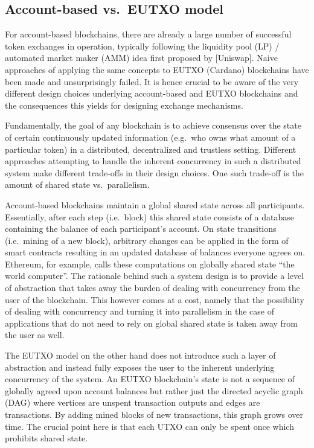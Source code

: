 \documentclass[11pt]{article}
\begin{document}
\subsection{Account-based vs.\ EUTXO model}\label{account-vs-eutxo}

For account-based blockchains, there are already a large number of successful token exchanges in operation, typically following the liquidity pool (LP) / automated market maker (AMM) idea first proposed by [Uniswap]. Naive approaches of applying the same concepts to EUTXO (Cardano) blockchains have been made and unsurprisingly failed. It is hence crucial to be aware of the very different design choices underlying account-based and EUTXO blockchains and the consequences this yields for designing exchange mechanisms.

Fundamentally, the goal of any blockchain is to achieve consensus over the state of certain continuously updated information (e.g.\ who owns what amount of a particular token) in a distributed, decentralized and trustless setting. Different approaches attempting to handle the inherent concurrency in such a distributed system make different trade-offs in their design choices. One such trade-off is the amount of shared state vs.\ parallelism.

Account-based blockchains maintain a global shared state across all participants. Essentially, after each step (i.e.\ block) this shared state consists of a database containing the balance of each participant's account. On state transitions (i.e.\ mining of a new block), arbitrary changes can be applied in the form of smart contracts resulting in an updated database of balances everyone agrees on. Ethereum, for example, calls these computations on globally shared state ``the world computer''. The rationale behind such a system design is to provide a level of abstraction that takes away the burden of dealing with concurrency from the user of the blockchain. This however comes at a cost, namely that the possibility of dealing with concurrency and turning it into parallelism in the case of applications that do not need to rely on global shared state is taken away from the user as well.

The EUTXO model on the other hand does not introduce such a layer of abstraction and instead fully exposes the user to the inherent underlying concurrency of the system. An EUTXO blockchain's state is not a sequence of globally agreed upon account balances but rather just the directed acyclic graph (DAG) where vertices are unspent transaction outputs and edges are transactions. By adding mined blocks of new transactions, this graph grows over time. The crucial point here is that each UTXO can only be spent once which prohibits shared state.
\end{document}

